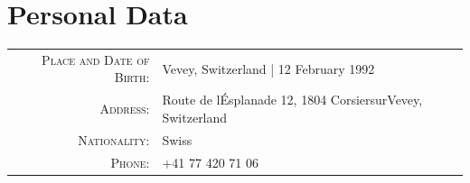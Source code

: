\documentclass[a4paper,11pt]{article} %
\begin{document}

\section{Personal Data}
\begin{center}
\begin{tabular}{rl}
\textsc{Place and Date of Birth:} & Vevey, Switzerland  | 12 February 1992 \\
\textsc{Address:} & Route de l\'Esplanade 12, 1804 Corsier\-sur\-Vevey, Switzerland \\
\textsc{Nationality:} & Swiss \\
\textsc{Phone:} & +41 77 420 71 06\\
\end{tabular}
\end{center}
\end{document}
